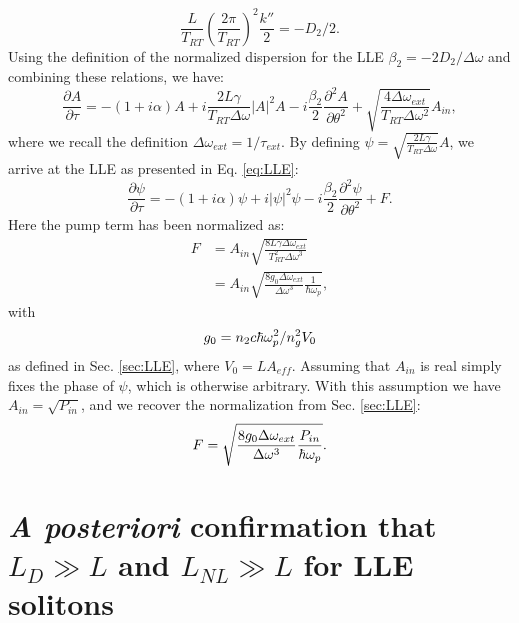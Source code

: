 \begin{equation}
\frac{L}{T_{RT}}\left(\frac{2\pi}{T_{RT}}\right)^2\frac{k''}{2}=-D_2/2.
\end{equation}
Using the definition of the normalized dispersion for the LLE $\beta_2=-2D_2/\Delta\omega$ and combining these relations, we have:
\begin{equation}
\frac{\partial A}{\partial\tau}=-(1+i\alpha)A+i\frac{2L\gamma}{T_{RT}\Delta\omega}|A|^2A-i\frac{\beta_2}{2}\frac{\partial^2 A}{\partial\theta^2} +\sqrt{\frac{4\Delta\omega_{ext}}{T_{RT}\Delta\omega^2}}A_{in},
\end{equation}
where we recall the definition $\Delta\omega_{ext}=1/\tau_{ext}$. By defining $\psi=\sqrt{\frac{2L\gamma}{T_{RT}\Delta\omega}}A$, we arrive at the LLE as presented in Eq. \ref{eq:LLE}:
\begin{equation}
\frac{\partial \psi}{\partial \tau}=-(1+i \alpha) \psi + i|\psi|^2 \psi -i \frac{\beta_2}{2} \frac{\partial^2 \psi}{\partial \theta^2} +F.
\end{equation}
Here the pump term has been normalized as:
\begin{align}
F&=A_{in}\sqrt{\frac{8 L \gamma \Delta\omega_{ext}}{T_{RT}^2\Delta\omega^3}}\\
&=A_{in}\sqrt{\frac{8g_0\Delta\omega_{ext}}{\Delta\omega^3}\frac{1}{\hbar\omega_p}},
\end{align}
with
\begin{equation}
g_0=n_2 c \hbar \omega_{p}^2/n_g^2 V_0
\end{equation}
as defined in Sec. \ref{sec:LLE}, where $V_0=L A_{eff}$. Assuming that $A_{in}$ is real simply fixes the phase of $\psi$, which is otherwise arbitrary. With this assumption we have $A_{in}=\sqrt{P_{in}}$, and we recover the normalization from Sec. \ref{sec:LLE}:
\begin{equation}
F=\sqrt{\frac{8 g_0\Delta\omega_{ext}}{\Delta\omega^3}\frac{P_{in}}{\hbar \omega_{p}}}.
\end{equation}

\section{\textit{A posteriori} confirmation that $L_D\gg L$ and $L_{NL}\gg L$ for LLE solitons}

